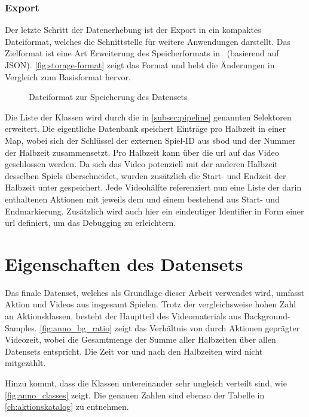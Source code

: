 \subsubsection{Export}

Der letzte Schritt der Datenerhebung ist der Export in ein kompaktes Dateiformat, welches die Schnittstelle für weitere Anwendungen darstellt.
Das Zielformat ist eine Art Erweiterung des Speicherformats in~\cite{Caba15} (basierend auf JSON).
\autoref{fig:storage-format} zeigt das Format und hebt die Änderungen in Vergleich zum Basisformat hervor.

\begin{figure}
    \centering
    \caption{Dateiformat zur Speicherung des Datensets}
    \label{fig:storage-format}
\end{figure}

Die Liste der Klassen wird durch die in \autoref{subsec:pipeline} genannten Selektoren erweitert.
Die eigentliche Datenbank speichert Einträge pro Halbzeit in einer Map, wobei sich der Schlüssel der externen Spiel-ID aus \gls{sbod} und der Nummer der Halbzeit zusammensetzt.
Pro Halbzeit kann über die \gls{url} auf das Video geschlossen werden.
Da sich das Video potenziell mit der anderen Halbzeit desselben Spiels überschneidet, wurden zusätzlich die Start- und Endzeit der Halbzeit unter  gespeichert.
Jede Videohälfte referenziert nun eine Liste der darin enthaltenen Aktionen mit jeweils dem  und einem  bestehend aus Start- und Endmarkierung.
Zusätzlich wird auch hier ein eindeutiger Identifier in Form einer \gls{url} definiert, um das Debugging zu erleichtern.

\section{Eigenschaften des Datensets}
\label{sec:eigenschaften-des-datensets}

Das finale Datenset, welches als Grundlage dieser Arbeit verwendet wird, umfasst \noaction Aktion und \novideos Videos aus insgesamt \nomatches Spielen.
Trotz der vergleichsweise hohen Zahl an Aktionsklassen, besteht der Hauptteil des Videomaterials aus Background-Samples.
\autoref{fig:anno_bg_ratio} zeigt das Verhältnis von durch Aktionen geprägter Videozeit, wobei die Gesamtmenge der Summe aller Halbzeiten über allen Datensets entspricht.
Die Zeit vor und nach den Halbzeiten wird nicht mitgezählt.

Hinzu kommt, dass die Klassen untereinander sehr ungleich verteilt sind, wie \autoref{fig:anno_classes} zeigt.
Die genauen Zahlen sind ebenso der Tabelle in \autoref{ch:aktionskatalog} zu entnehmen.

